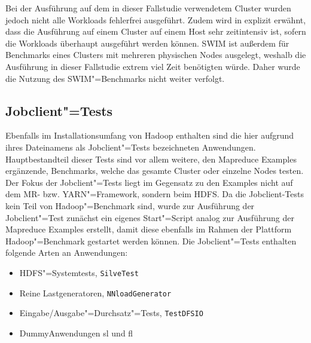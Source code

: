 Bei der Ausführung auf dem in dieser Fallstudie verwendetem Cluster wurden jedoch nicht alle Workloads fehlerfrei ausgeführt.
Zudem wird in \cite{InriaTutorial} explizit erwähnt, dass die Ausführung auf einem Cluster auf einem Host sehr zeitintensiv ist, sofern die Workloads überhaupt ausgeführt werden können.
\gls{SWIM} ist außerdem für Benchmarks eines Clusters mit mehreren physischen Nodes ausgelegt, weshalb die Ausführung in dieser Fallstudie extrem viel Zeit benötigten würde.
Daher wurde die Nutzung des \gls{SWIM}"=Benchmarks nicht weiter verfolgt.

\subsection{Jobclient"=Tests}
\label{subsec:jobclient}

Ebenfalls im Installationsumfang von Hadoop enthalten sind die hier aufgrund ihres Dateinamens als Jobclient"=Tests bezeichneten Anwendungen.
Hauptbestandteil dieser \glspl{Test} sind vor allem weitere, den Mapreduce Examples ergänzende, Benchmarks, welche das gesamte Cluster oder einzelne Nodes testen.
Der Fokus der Jobclient"=Tests liegt im Gegensatz zu den Examples nicht auf dem \gls{MR}- bzw. \gls{YARN}"=Framework, sondern beim \gls{HDFS}.
Da die Jobclient-Tests kein Teil von Hadoop"=Benchmark sind, wurde zur Ausführung der Jobclient"=Test zunächst ein eigenes Start"=Script analog zur Ausführung der Mapreduce Examples erstellt, damit diese ebenfalls im Rahmen der Plattform Hadoop"=Benchmark gestartet werden können.
Die Jobclient"=Tests enthalten \uA folgende Arten an Anwendungen:

\begin{itemize}
    \item \gls{HDFS}"=Systemtests, \zB \texttt{SilveTest}
    \item Reine Lastgeneratoren, \zB \texttt{NNloadGenerator}
    \item Eingabe/Ausgabe"=Durchsatz"=Tests, \zB \texttt{TestDFSIO}
    \item Dummy\gls{Anwendung}en \acrlong{sl} und \acrlong{fl}
\end{itemize}
